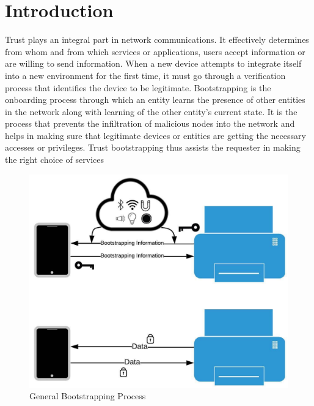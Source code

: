 \section{Introduction}

Trust plays an integral part in network communications.
It effectively determines from whom and from which services or applications, users accept information or are willing to send information.
When a new device attempts to integrate itself into a new environment for the first time, it must go through a verification process that identifies the device to be legitimate.
Bootstrapping is the onboarding process through which an entity learns the presence of other entities in the network along with learning of the other entity’s current state.
It is the process that prevents the infiltration of malicious nodes into the network and helps in making sure that legitimate devices or entities are getting the necessary accesses or privileges.
Trust bootstrapping thus assists the requester in making the right choice of services

\begin{figure}[h]
\centering
\includegraphics[scale=0.35]{figures/picture.pdf}
\caption{General Bootstrapping Process}
  \label{fig:pic}
\end{figure}
